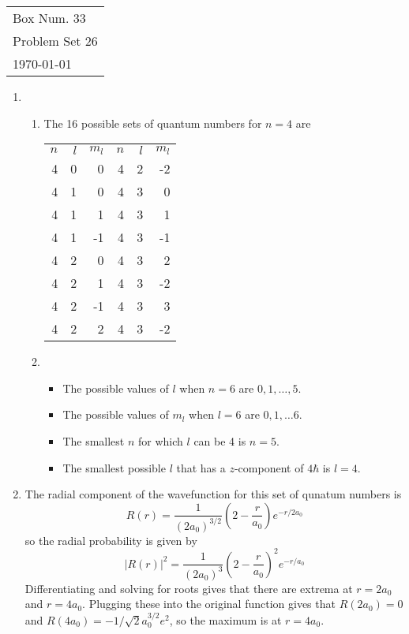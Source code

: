 \documentclass[10pt]{article}
\begin{document}
  \begin{tabular}{l}
    Box Num. 33 \\
    Problem Set 26 \\
    \today
  \end{tabular}

  \begin{enumerate}
    \item \begin{enumerate}
        \item The 16 possible sets of quantum numbers for $n=4$ are

        \begin{tabular}{rrr|rrr}
            \toprule
            $n$ & $l$ & $m_l$ & $n$ & $l$ & $m_l$ \\
            4 & 0 & 0 & 4 & 2 & -2 \\
            4 & 1 & 0 & 4 & 3 & 0 \\
            4 & 1 & 1 & 4 & 3 & 1 \\
            4 & 1 & -1 & 4 & 3 & -1 \\
            4 & 2 & 0 & 4 & 3 & 2 \\
            4 & 2 & 1 & 4 & 3 & -2 \\
            4 & 2 & -1 & 4 & 3 & 3 \\
            4 & 2 & 2 & 4 & 3 & -2
        \end{tabular}

        \item \begin{itemize}
            \item The possible values of $l$ when $n=6$ are $0, 1, \dots, 5$.
            \item The possible values of $m_l$ when $l=6$ are $0, 1, \dots 6$.
            \item The smallest $n$ for which $l$ can be 4 is $n=5$.
            \item The smallest possible $l$ that has a $z$-component of $4\hbar$ is $l=4$.
        \end{itemize}
    \end{enumerate}
    \item The radial component of the wavefunction for this set of qunatum numbers is
    \begin{equation*}
        R(r) = \frac{1}{(2a_0)^{3/2}} \left( 2-\frac{r}{a_0} \right) e^{-r/2a_0}
    \end{equation*}
    so the radial probability is given by
    \begin{equation*}
        |R(r)|^2 = \frac{1}{(2a_0)^3} \left( 2 - \frac{r}{a_0} \right)^2 e^{-r/{a_0}}
    \end{equation*}
    Differentiating and solving for roots gives that there are extrema at $r=2a_0$ and $r=4a_0$. Plugging these into the original function gives that $R(2a_0) = 0$ and $R(4a_0) = -1/\sqrt{2} a_0^{3/2}e^2$, so the maximum is at $r=4a_0$.


\end{enumerate}
\end{document}
